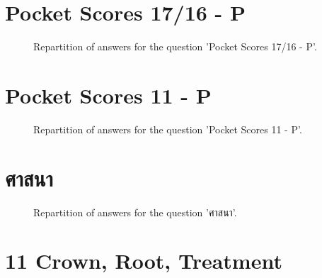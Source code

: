 \documentclass[12pt]{article}
\begin{document}
\clearpage{}
\section{Pocket Scores
17/16 - P}

\label{sec:58}


\begin{figure}[h!]
    \caption{\label{figure:q58-1}Repartition of answers for the question 'Pocket Scores
17/16 - P'.}
\end{figure}



\clearpage{}
\section{Pocket Scores
11 - P}

\label{sec:64}


\begin{figure}[h!]
    \caption{\label{figure:q64-1}Repartition of answers for the question 'Pocket Scores
11 - P'.}
\end{figure}



\clearpage{}
\section{ศาสนา}

\label{sec:20}


\begin{figure}[h!]
    \caption{\label{figure:q20-1}Repartition of answers for the question 'ศาสนา'.}
\end{figure}



\clearpage{}
\section{11
Crown, Root, Treatment}
\end{document}
